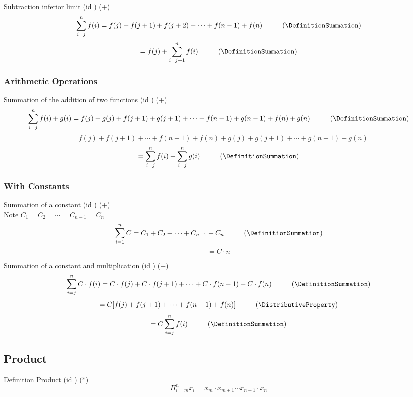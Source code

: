 \documentclass{book}
\begin{document}
                    Subtraction inferior limit (id \SubtractionInferiorLimit) (+)
                    \[\sum^n_{i=j}f(i) = f(j) + f(j + 1) + f(j + 2) + \cdots + f(n - 1) + f(n) \hspace{1cm} (\DefinitionSummation)\]
                    \[= f(j) + \sum^{n}_{i=j+1} f(i) \hspace{1cm} (\DefinitionSummation)\]

                \subsubsection{Arithmetic Operations}
                    Summation of the addition of two functions (id \SummationAdditionFunctions) (+)
                    \[\sum^n_{i=j} f(i) + g(i) = f(j) + g(j) + f(j + 1) + g(j + 1) + \cdots + f(n - 1) + g(n - 1) + f(n) + g(n) \hspace{1cm} (\DefinitionSummation)\]
                    \[= f(j) + f(j + 1) + \cdots + f(n - 1) + f(n) + g(j) + g(j + 1) + \cdots + g(n - 1) + g(n)\]
                    \[= \sum^n_{i=j} f(i) + \sum^n_{i=j} g(i) \hspace{1cm} (\DefinitionSummation)\]

                \subsubsection{With Constants}
                    Summation of a constant (id \SummationConstant) (+) \\
                    
                    Note $C_1 = C_2 = \cdots = C_{n - 1} = C_n$
                    \[\sum^n_{i=1} C = C_1 + C_2 + \cdots + C_{n - 1} + C_n \hspace{1cm} (\DefinitionSummation)\]
                    \[= C \cdot n\]

                    Summation of a constant and multiplication (id \SummationConstantMultiplication) (+)
                    \[\sum^n_{i=j} C \cdot f(i) = C \cdot f(j) + C \cdot f(j + 1) + \cdots + C \cdot f(n - 1) + C \cdot f(n) \hspace{1cm} (\DefinitionSummation)\]
                    \[= C [f(j) + f(j + 1) + \cdots + f(n - 1) + f(n)] \hspace{1cm} (\DistributiveProperty)\]
                    \[= C \sum^n_{i=j} f(i) \hspace{1cm} (\DefinitionSummation)\]

            \subsection{Product}
                Definition Product (id \DefinitionProduct) (*)
                \[ \Pi^{n}_{i=m} x_i = x_m \cdot x_{m + 1} \cdots x_{n - 1} \cdot x_n\]
\end{document}
